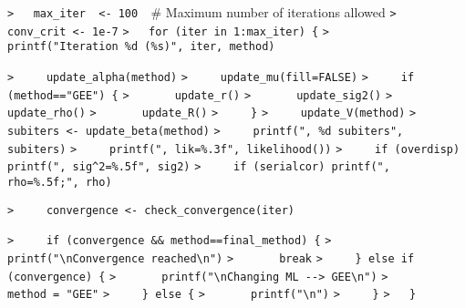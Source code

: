 \documentclass[a4paper]{article}
\begin{document}
\verb~>   max_iter  <- 100  ~{\sffamily\# Maximum number of iterations allowed}\newline
\verb~>   conv_crit <- 1e-7~\newline
\verb~>   for (iter in 1:max_iter) {~\newline
\verb~>     printf("Iteration %d (%s)", iter, method)~\par

\verb~>     update_alpha(method)~\newline
\verb~>     update_mu(fill=FALSE)~\newline
\verb~>     if (method=="GEE") {~\newline
\verb~>       update_r()~\newline
\verb~>       update_sig2()~\newline
\verb~>       update_rho()~\newline
\verb~>       update_R()~\newline
\verb~>     }~\newline
\verb~>     update_V(method)~\newline
\verb~>     subiters <- update_beta(method)~\newline
\verb~>     printf(", %d subiters", subiters)~\newline
\verb~>     printf(", lik=%.3f", likelihood())~\newline
\verb~>     if (overdisp)  printf(", sig^2=%.5f", sig2)~\newline
\verb~>     if (serialcor) printf(", rho=%.5f;", rho)~\par

\verb~>     convergence <- check_convergence(iter)~\par

\verb~>     if (convergence && method==final_method) {~\newline
\verb~>       printf("\nConvergence reached\n")~\newline
\verb~>       break~\newline
\verb~>     } else if (convergence) {~\newline
\verb~>       printf("\nChanging ML --> GEE\n")~\newline
\verb~>       method = "GEE"~\newline
\verb~>     } else {~\newline
\verb~>       printf("\n")~\newline
\verb~>     }~\newline
\verb~>   }~\par
\end{document}
